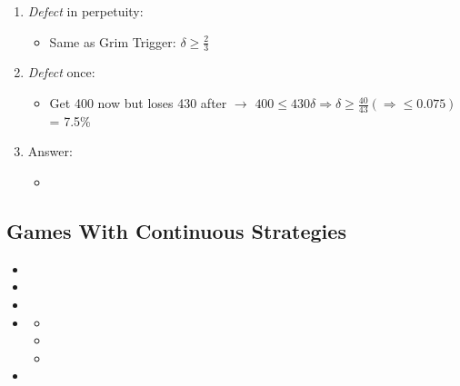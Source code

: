 \documentclass[11pt, english]{article}
\begin{document}
	\begin{enumerate}                              
        \setlength\itemsep{0cm}                                   
                \item \textit{Defect} in perpetuity:                         
                \begin{itemize}                        
			\item Same as Grim Trigger: $\delta\ge\frac{2}{3}$
                \end{itemize}   
                \item \textit{Defect} once:
                \begin{itemize}       
			\item Get 400 now but loses 430 after $\rightarrow$ $400\le430\delta\Rightarrow\delta\ge\frac{40}{43}(\Rightarrow\le0.075)$ = 7.5\%
                \end{itemize}                              
                \item Answer:
                \begin{itemize}
                        \item {}
		\end{itemize}
        \end{enumerate}


	\newpage

	\subsection{Games With Continuous Strategies}

	\begin{itemize}
	\setlength\itemsep{0cm}
		\item 
		\item 
		\item 
		\item 
		\begin{itemize}
			\item 
			\item 
			\item 
		\end{itemize}
		\item 
	\end{itemize}
\end{document}
